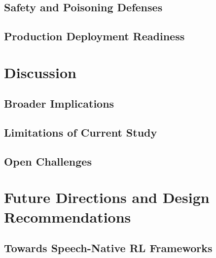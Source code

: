 \documentclass[conference]{IEEEtran}
\begin{document}
\subsection{Safety and Poisoning Defenses}

\subsection{Production Deployment Readiness}

\section{Discussion}

\subsection{Broader Implications}

\subsection{Limitations of Current Study}

\subsection{Open Challenges}

\section{Future Directions and Design Recommendations}

\subsection{Towards Speech-Native RL Frameworks}
\end{document}
